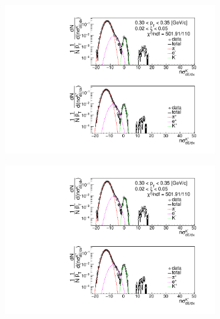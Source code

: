 \begin{figure}[h!]
\begin{subfigure}{.3\textwidth}
	\end{subfigure}
	\begin{subfigure}{.33\textwidth}
		\includegraphics[width=\linewidth, page=4]{chapters/chrgSTAR/img/dEdx/fit2019_thirdStep_1_0.pdf}
	\end{subfigure}
	\begin{subfigure}{.33\textwidth}
		\includegraphics[width=\linewidth, page=5]{chapters/chrgSTAR/img/dEdx/fit2019_thirdStep_1_0.pdf}
	\end{subfigure}
	\begin{subfigure}{.3\textwidth}

\end{subfigure}
\end{figure}
